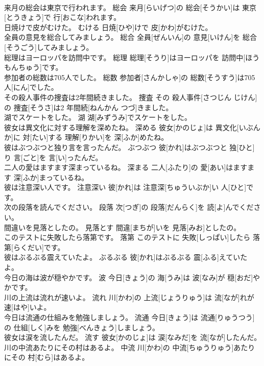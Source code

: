 \documentclass[8pt]{extreport}
\begin{document}
\begin{CJK}{UTF8}{min}
\\	来月の総会は東京で行われます。	総会	来月[らいげつ]の 総会[そうかい]は 東京[とうきょう]で 行[おこな]われます。	
\\	日焼けで皮がむけた。	むける	日焼[ひや]けで 皮[かわ]がむけた。	
\\	全員の意見を総合してみましょう。	総合	全員[ぜんいん]の 意見[いけん]を 総合[そうごう]してみましょう。	
\\	総理はヨーロッパを訪問中です。	総理	総理[そうり]はヨーロッパを 訪問中[ほうもんちゅう]です。	
\\	参加者の総数は705人でした。	総数	参加者[さんかしゃ]の 総数[そうすう]は705 人[にん]でした。	
\\	その殺人事件の捜査は2年間続きました。	捜査	その 殺人事件[さつじん じけん]の 捜査[そうさ]は2 年間続[ねんかん つづ]きました。	
\\	湖でスケートをした。	湖	湖[みずうみ]でスケートをした。	
\\	彼女は異文化に対する理解を深めたね。	深める	彼女[かのじょ]は 異文化[いぶんか]に 対[たい]する 理解[りかい]を 深[ふか]めたね。	
\\	彼はぶつぶつと独り言を言ったんだ。	ぶつぶつ	彼[かれ]はぶつぶつと 独[ひと]り 言[ごと]を 言[い]ったんだ。	
\\	二人の愛はますます深まっているね。	深まる	二人[ふたり]の 愛[あい]はますます 深[ふか]まっているね。	
\\	彼は注意深い人です。	注意深い	彼[かれ]は 注意深[ちゅういぶか]い 人[ひと]です。	
\\	次の段落を読んでください。	段落	次[つぎ]の 段落[だんらく]を 読[よ]んでください。	
\\	間違いを見落としたの。	見落とす	間違[まちが]いを 見落[みお]としたの。	
\\	このテストに失敗したら落第です。	落第	このテストに 失敗[しっぱい]したら 落第[らくだい]です。	
\\	彼はぶるぶる震えていたよ。	ぶるぶる	彼[かれ]はぶるぶる 震[ふる]えていたよ。	
\\	今日の海は波が穏やかです。	波	今日[きょう]の 海[うみ]は 波[なみ]が 穏[おだ]やかです。	
\\	川の上流は流れが速いよ。	流れ	川[かわ]の 上流[じょうりゅう]は 流[なが]れが 速[はや]いよ。	
\\	今日は流通の仕組みを勉強しましょう。	流通	今日[きょう]は 流通[りゅうつう]の 仕組[しく]みを 勉強[べんきょう]しましょう。	
\\	彼女は涙を流したんだ。	流す	彼女[かのじょ]は 涙[なみだ]を 流[なが]したんだ。	
\\	川の中流あたりにその村はあるよ。	中流	川[かわ]の 中流[ちゅうりゅう]あたりにその 村[むら]はあるよ。	

\end{CJK}
\end{document}
